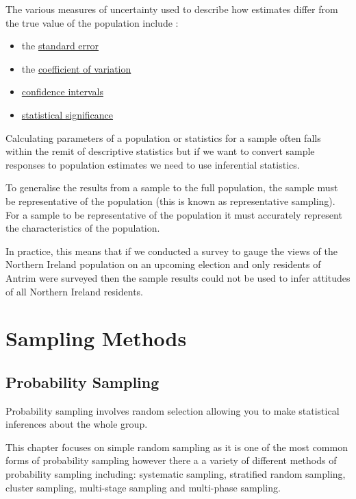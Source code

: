 \documentclass[
]{book}
\begin{document}
The various measures of uncertainty used to describe how estimates differ from the true value of the population include \citep{uncertainty}:

\begin{itemize}
\item
  the \protect\hyperlink{stderr}{standard error}
\item
  the \protect\hyperlink{coeff}{coefficient of variation}
\item
  \protect\hyperlink{confint}{confidence intervals}
\item
  \protect\hyperlink{signif}{statistical significance}
\end{itemize}

Calculating parameters of a population or statistics for a sample often falls within the remit of descriptive statistics but if we want to convert sample responses to population estimates we need to use inferential statistics.

To generalise the results from a sample to the full population, the sample must be representative of the population (this is known as representative sampling). For a sample to be representative of the population it must accurately represent the characteristics of the population.

In practice, this means that if we conducted a survey to gauge the views of the Northern Ireland population on an upcoming election and only residents of Antrim were surveyed then the sample results could not be used to infer attitudes of all Northern Ireland residents.

\hypertarget{sampling-methods}{%
\section{Sampling Methods}\label{sampling-methods}}

\hypertarget{probability-sampling}{%
\subsection{Probability Sampling}\label{probability-sampling}}

Probability sampling involves random selection allowing you to make statistical inferences about the whole group.

This chapter focuses on simple random sampling as it is one of the most common forms of probability sampling however there a a variety of different methods of probability sampling including: systematic sampling, stratified random sampling, cluster sampling, multi-stage sampling and multi-phase sampling.
\end{document}
